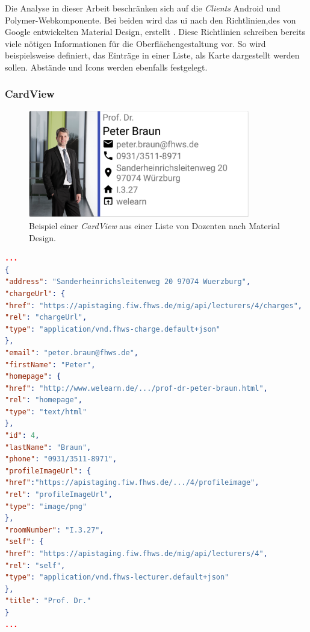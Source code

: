 Die Analyse in dieser Arbeit beschränken sich auf die \textit{Clients} Android und Polymer-Webkomponente. Bei beiden wird das \acf{ui} nach den Richtlinien,des von Google entwickelten Material Design, erstellt \cite{material}. Diese Richtlinien schreiben bereits viele nötigen Informationen für die Oberflächengestaltung vor. So wird beispielsweise definiert, das Einträge in einer Liste, als Karte dargestellt werden sollen. Abstände und Icons werden ebenfalls festgelegt.

\subsubsection{CardView}

\begin{figure}[H]
	\begin{center}
		\includegraphics[width=0.86\textwidth]{images/card.png}
		\caption{Beispiel einer \textit{CardView} aus einer Liste von Dozenten nach Material Design.}
		\label{fig:card}
	\end{center}
\end{figure}

\newpage

\begin{lstlisting}[label=lst:braun_json,
language=json,
firstnumber=1,
caption=Demo Daten eines Dozenten.]	
...			   
{
"address": "Sanderheinrichsleitenweg 20 97074 Wuerzburg",
"chargeUrl": {
"href": "https://apistaging.fiw.fhws.de/mig/api/lecturers/4/charges",
"rel": "chargeUrl",
"type": "application/vnd.fhws-charge.default+json"
},
"email": "peter.braun@fhws.de",
"firstName": "Peter",
"homepage": {
"href": "http://www.welearn.de/.../prof-dr-peter-braun.html",
"rel": "homepage",
"type": "text/html"
},
"id": 4,
"lastName": "Braun",
"phone": "0931/3511-8971",
"profileImageUrl": {
"href":"https://apistaging.fiw.fhws.de/.../4/profileimage",
"rel": "profileImageUrl",
"type": "image/png"
},
"roomNumber": "I.3.27",
"self": {
"href": "https://apistaging.fiw.fhws.de/mig/api/lecturers/4",
"rel": "self",
"type": "application/vnd.fhws-lecturer.default+json"
},
"title": "Prof. Dr."
}
...
\end{lstlisting}

